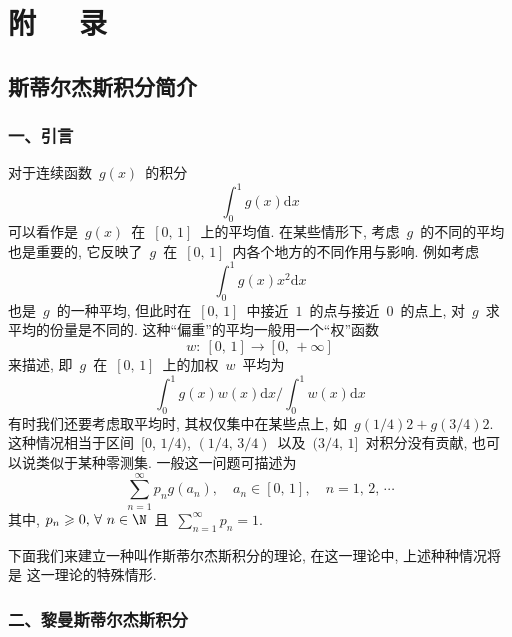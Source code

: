 \chapter*{附 \ \ 录}

\setcounter{chapter}{7}
\setcounter{Theorem}{0}
\setcounter{Definition}{0}
\setcounter{Proposition}{0}
\setcounter{Corollary}{0}
\setcounter{Remark}{0}
\setcounter{Lemma}{0}

\bigskip

\bigskip


\section*{斯蒂尔杰斯积分简介}

\setcounter{section}{1}

\bigskip

\subsection*{一、引言}

\qquad 对于连续函数~$g(x)$~的积分
\[
\int_0^1 g(x) \mathrm{d} x
\]
可以看作是~$g(x)$~在~$[0,\,1]$~上的平均值. 在某些情形下, 考虑~$g$~的不同的平均也是重要的, 它反映了~$g$~在~$[0,\,1]$~内各个地方的不同作用与影响. 例如考虑
\[
\int_0^1 g(x) x^2 \mathrm{d} x
\]
也是~$g$~的一种平均, 但此时在~$[0,\,1]$~中接近~$1$~的点与接近~$0$~的点上, 对~$g$~求平均的份量是不同的. 这种``偏重''的平均一般用一个``权''函数
\[
w:\:[0,\,1] \rightarrow [0,\,+\infty]
\]
来描述, 即~$g$~在~$[0,\,1]$~上的加权~$w$~平均为
\[
\int_0^1 g(x)w(x) \mathrm{d} x \Big/ \int_0^1 w(x) \mathrm{d} x
\]
有时我们还要考虑取平均时, 其权仅集中在某些点上, 如~$g(1/4)2 + g(3/4)2$.
这种情况相当于区间~$[0,\,1/4)$, $(1/4,\,3/4)$~以及~$(3/4,\,1]$~对积分没有贡献, 也可以说类似于某种零测集.
一般这一问题可描述为
\[
\sum_{n=1}^\infty p_n g(a_n), \quad a_n \in [0,\,1], \quad n=1,\,2,\,\cdots
\]
其中, $p_n \geqslant 0,\,\forall~n \in \N$~且~$\sum\limits_{n=1}^\infty p_n=1$.

下面我们来建立一种叫作斯蒂尔杰斯积分的理论, 在这一理论中, 上述种种情况将是
这一理论的特殊情形.

\medskip

\subsection*{二、黎曼\raisebox{0.5mm}{--}斯蒂尔杰斯积分}

